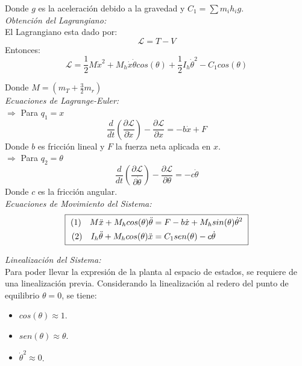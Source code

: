 \documentclass[final,times,twocolumn,5p]{ResumenEjecutivo}
\begin{document}
Donde $g$ es la aceleración debido a la gravedad y $C_1=\sum m_ih_ig$.\\

\textit{Obtención del Lagrangiano:}\\

El Lagrangiano esta dado por:
\[
\mathcal{L} = T - V
\]
Entonces:
\[
\mathcal{L} =  \displaystyle\frac{1}{2}M\dot{x}^2+M_h\dot{x}\dot{\theta}cos(\theta)+\frac{1}{2}I_h\dot{\theta}^2-C_1cos(\theta)
\]

Donde $M=\left(m_T+\frac{3}{2}m_r\right)$\\

\textit{Ecuaciones de Lagrange-Euler:}\\

$\Rightarrow$ Para $q_1=x$
\[
\displaystyle\frac{d}{dt}\left(\frac{\partial\mathcal{L}}{\partial\dot{x}}\right)-\frac{\partial\mathcal{L}}{\partial x} =  -b\dot{x}+F
\]
Donde $b$ es fricción lineal y $F$ la fuerza neta aplicada en $x$.\\

$\Rightarrow$ Para $q_2=\theta$
\[
\displaystyle\frac{d}{dt}\left(\frac{\partial\mathcal{L}}{\partial\dot{\theta}}\right)-\frac{\partial\mathcal{L}}{\partial\theta} =  -c\dot{\theta}
\]
Donde $c$ es la fricción angular.\\

\textit{Ecuaciones de Movimiento del Sistema:}
\[
\fbox{
  $\begin{aligned}
  (1) \quad M\ddot{x} + M_hcos(\theta)\ddot{\theta}&= F-b\dot{x}+M_hsin(\theta)\dot{\theta}^2 \\
  (2) \quad I_h\ddot{\theta} +M_hcos(\theta)\ddot{x}&= C_1sen(\theta)-c\dot{\theta}
  \end{aligned}$
}
\]

\textit{Linealización del Sistema:}\\

Para poder llevar la expresión de la planta al espacio de estados, se requiere de una linealización previa. Considerando la linealización al redero del punto de equilibrio $\theta=0$, se tiene:
\vspace{-0.6cm}
\begin{itemize}
    \item $cos(\theta)\approx1$.
    \vspace{-0.2cm}
    \item $sen(\theta)\approx\theta$.
    \vspace{-0.2cm}
    \item $\dot{\theta}^2\approx0$.
\end{itemize}
\end{document}
